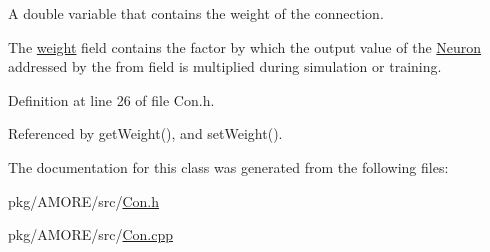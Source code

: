 A double variable that contains the weight of the connection. 

The \hyperlink{class_con_a7f46485ba5b41971ea38641f9e7d1be0}{weight} field contains the factor by which the output value of the \hyperlink{class_neuron}{Neuron} addressed by the from field is multiplied during simulation or training. 

Definition at line 26 of file Con.h.



Referenced by getWeight(), and setWeight().



The documentation for this class was generated from the following files:\begin{DoxyCompactItemize}
\item 
pkg/AMORE/src/\hyperlink{_con_8h}{Con.h}\item 
pkg/AMORE/src/\hyperlink{_con_8cpp}{Con.cpp}\end{DoxyCompactItemize}
